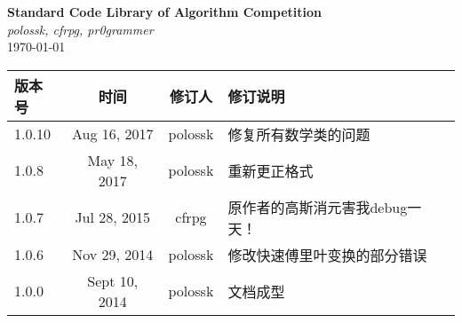 \documentclass[12pt,a4paper]{book}
\title{\strtitle}
\author{\strauthor}
\date{\today}
\newcommand\strtitle{Standard Code Library of Algorithm Competition}
\newcommand\strauthor{polossk, cfrpg, pr0grammer}
\begin{document}
\frontmatter
\begin{titlepage}
\vspace*{\fill}
\begin{center}
    {\Huge \bf \strtitle} \\
    \vspace{1em}
    {\Large \it \strauthor} \\
    \vspace{1em}
    {\large \today} \\
\end{center}
\vspace{1em}
\begin{longtable}{|l|c|c|l|}
    \hline
    版本号 & 时间 & 修订人 & 修订说明 \\
    \hline
    1.0.10 & Aug 16, 2017 & polossk & 修复所有数学类的问题 \\
    \hline
    1.0.8 & May 18, 2017 & polossk & 重新更正格式 \\
    \hline
    1.0.7 & Jul 28, 2015 & cfrpg & 原作者的高斯消元害我debug一天！ \\
    \hline
    1.0.6 & Nov 29, 2014 & polossk & 修改快速傅里叶变换的部分错误 \\
    \hline
    1.0.0 & Sept 10, 2014 & polossk & 文档成型 \\
    \hline
\end{longtable}
\end{titlepage}
\thispagestyle{fancy}
\clearpage
{}
{}
\begin{multicols}{2}
\tableofcontents
\end{multicols}
\clearpage


\mainmatter
% 

% 


\end{document}
